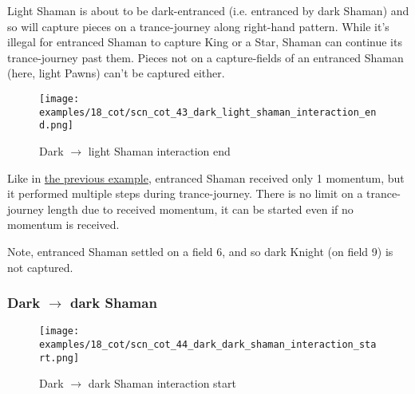 Light Shaman is about to be dark-entranced (i.e. entranced by dark Shaman) and
so will capture pieces on a trance-journey along right-hand pattern. While it's
illegal for entranced Shaman to capture King or a Star, Shaman can continue its
trance-journey past them. Pieces not on a capture-fields of an entranced Shaman
(here, light Pawns) can't be captured either.

\clearpage %

\noindent
\begin{figure}[!h]
\texttt{[image: examples/18\_cot/scn\_cot\_43\_dark\_light\_shaman\_interaction\_end.png]}
\caption{Dark $\rightarrow$ light Shaman interaction end}
\label{fig:scn_cot_43_dark_light_shaman_interaction_end}
\end{figure}

Like in
\hyperref[fig:scn_cot_40_light_light_shaman_interaction_start]{the previous example},
entranced Shaman received only 1 momentum, but it performed multiple steps during
trance-journey. There is no limit on a trance-journey length due to received momentum,
it can be started even if no momentum is received.

Note, entranced Shaman settled on a field 6, and so dark Knight (on field 9) is not
captured.

\clearpage %

\subsubsection*{Dark $\rightarrow$ dark Shaman}
\label{sec:Conquest of Tlalocan/Trance-journey/Interactions/Dark --> dark Shaman}

\vspace*{-1.5\baselineskip}
\noindent
\begin{figure}[!h]
\texttt{[image: examples/18\_cot/scn\_cot\_44\_dark\_dark\_shaman\_interaction\_start.png]}
\vspace*{-1.4\baselineskip}
\caption{Dark $\rightarrow$ dark Shaman interaction start}
\label{fig:scn_cot_44_dark_dark_shaman_interaction_start}
\end{figure}


